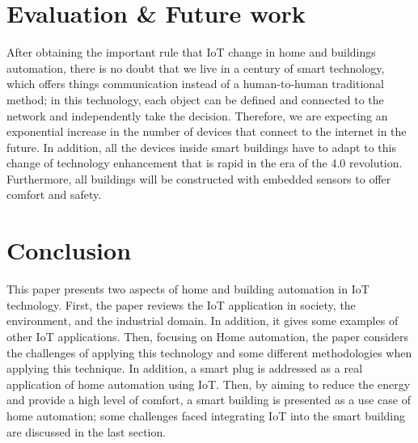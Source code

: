 \documentclass[conference]{IEEEtran}
\begin{document}
\section{Evaluation \& Future work   }

After obtaining the important rule that IoT change in home and buildings automation, there is no doubt that we live in a century of smart technology, which offers things communication instead of a human-to-human traditional method; in this technology, each object can be defined and connected to the network and independently take the decision. Therefore, we are expecting an exponential increase in the number of devices that connect to the internet in the future. In addition, all the devices inside smart buildings have to adapt to this change of technology enhancement that is rapid in the era of the 4.0 revolution. Furthermore, all buildings will be constructed with embedded sensors to offer comfort and safety. 



\section{Conclusion  }

This paper presents two aspects of home and building automation in IoT technology. First, the paper reviews the IoT application in society, the environment, and the industrial domain. In addition, it gives some examples of other IoT applications. Then, focusing on Home automation, the paper considers the challenges of applying this technology and some different methodologies when applying this technique. In addition, a smart plug is addressed as a real application of home automation using IoT. Then, by aiming to reduce the energy and provide a high level of comfort, a smart building is presented as a use case of home automation; some challenges faced integrating IoT into the smart building are discussed in the last section.
\end{document}
